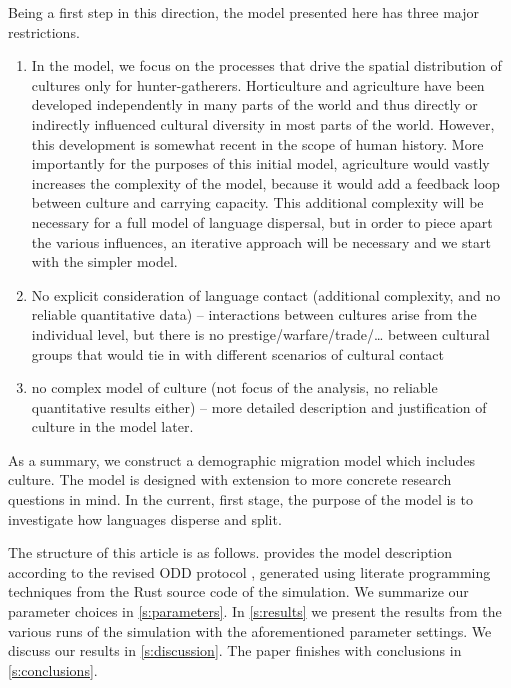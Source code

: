 \documentclass[a4paper,12pt]{scrartcl}
\begin{document}
Being a first step in this direction, the model presented here has three major restrictions.
\begin{enumerate}
\item In the model, we focus on the processes that drive the spatial
  distribution of cultures only for hunter-gatherers. Horticulture and
  agriculture have been developed independently in many parts of the world
  \parencite{} and thus directly or indirectly influenced cultural diversity in
  most parts of the world. However, this development is somewhat recent in the
  scope of human history. More importantly for the purposes of this initial
  model, agriculture would vastly increases the complexity of the model, because
  it would add a feedback loop between culture and carrying capacity. This
  additional complexity will be necessary for a full model of language
  dispersal, but in order to piece apart the various influences, an iterative
  approach will be necessary and we start with the simpler model.
\item No explicit consideration of language contact (additional complexity, and
  no reliable quantitative data) – interactions between cultures arise from the
  individual level, but there is no prestige/warfare/trade/… between cultural
  groups that would tie in with different scenarios of cultural contact
\item no complex model of culture (not focus of the analysis, no reliable
  quantitative results either) – more detailed description and justification of
  culture in the model later.
\end{enumerate}

As a summary, we construct a demographic migration model which includes culture.
The model is designed with extension to more concrete research questions in
mind. In the current, first stage, the purpose of the model is to investigate
how languages disperse and split.

The structure of this article is as follows.
 provides the model description according to the revised ODD
protocol \parencite{grimm2006standard,grimm2010odd}, generated using literate
programming techniques \parencite{knuth1984literate} from the Rust \parencite{}
source code of the simulation. We summarize our parameter choices in
\cref{s:parameters}. In \cref{s:results} we present the results from the various
runs of the simulation with the aforementioned parameter settings. We discuss
our results in \cref{s:discussion}. The paper finishes with conclusions in
\cref{s:conclusions}.
\end{document}
